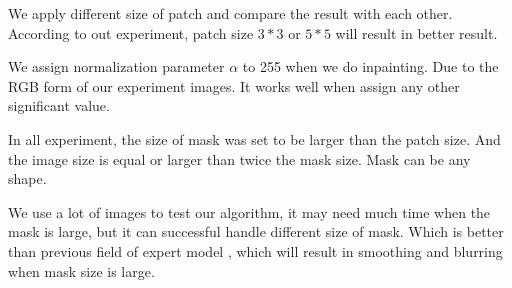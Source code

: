 We apply different size of patch and compare the result with each other. According to out experiment, patch size $3*3$ or $5*5$ will result in better result.

We assign normalization parameter $\alpha$ to 255 when we do inpainting. Due to the RGB form of our experiment images. It works well when assign any other significant value.

In all experiment, the size of mask was set to be larger than the patch size. And the image size is equal or larger than twice the mask size. Mask can be any shape.

We use a lot of images to test our algorithm, it may need much time when the mask is large, but it can successful handle different size of mask. Which is better than previous field of expert model \cite{ijcv09}, which will result in smoothing and blurring when mask size is large.
